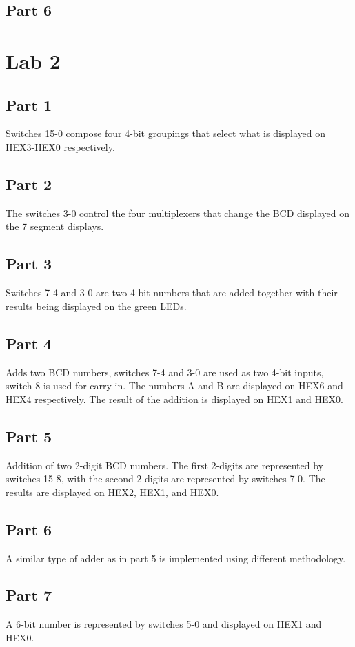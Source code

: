 \documentclass[oneside,letterpaper,12pt,titlepage]{article}
\begin{document}
\subsection{Part 6}

\section{Lab 2}
\subsection{Part 1}
Switches 15-0 compose four 4-bit groupings that select what is displayed on HEX3-HEX0 respectively.

\subsection{Part 2}
The switches 3-0 control the four multiplexers that change the BCD displayed on the 7 segment displays.

\subsection{Part 3}
Switches 7-4 and 3-0 are two 4 bit numbers that are added together with their results being displayed on the green LEDs.

\subsection{Part 4}
Adds two BCD numbers, switches 7-4 and 3-0 are used as two 4-bit inputs, switch 8 is used for carry-in. The numbers A and B are displayed on HEX6 and HEX4 respectively. The result of the addition is displayed on HEX1 and HEX0. 

\subsection{Part 5}
Addition of two 2-digit BCD numbers. The first 2-digits are represented by switches 15-8, with the second 2 digits are represented by switches 7-0. The results are displayed on HEX2, HEX1, and HEX0.

\subsection{Part 6}
A similar type of adder as in part 5 is implemented using different methodology.

\subsection{Part 7}
A 6-bit number is represented by switches 5-0 and displayed on HEX1 and HEX0.
\end{document}
